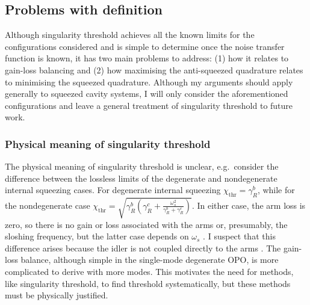 \subsection{Problems with definition}

Although singularity threshold achieves all the known limits for the configurations considered and is simple to determine once the noise transfer function is known, it has two main problems to address: (1) how it relates to gain-loss balancing and (2) how maximising the anti-squeezed quadrature relates to minimising the squeezed quadrature. 
Although my arguments should apply generally to squeezed cavity systems, I will only consider the aforementioned configurations and leave a general treatment of singularity threshold to future work.

\subsubsection{Physical meaning of singularity threshold}

The physical meaning of singularity threshold is unclear, e.g.\ consider the difference between the lossless limits of the degenerate and nondegenerate internal squeezing cases. For degenerate internal squeezing $\chi_\text{thr}=\gamma^b_R$, while for the nondegenerate case $\chi_\text{thr}=\sqrt{\gamma^b_R(\gamma^c_R+\frac{\omega_s^2}{\gamma^b_R+\gamma^c_R})}$. In either case, the arm loss is zero, so there is no gain or loss associated with the arms or, presumably, the sloshing frequency, but the latter case depends on $\omega_s$ . I suspect that this difference arises because the idler is not coupled directly to the arms . The gain-loss balance, although simple in the single-mode degenerate OPO, is more complicated to derive with more modes. This motivates the need for methods, like singularity threshold, to find threshold systematically, but these methods must be physically justified. 

